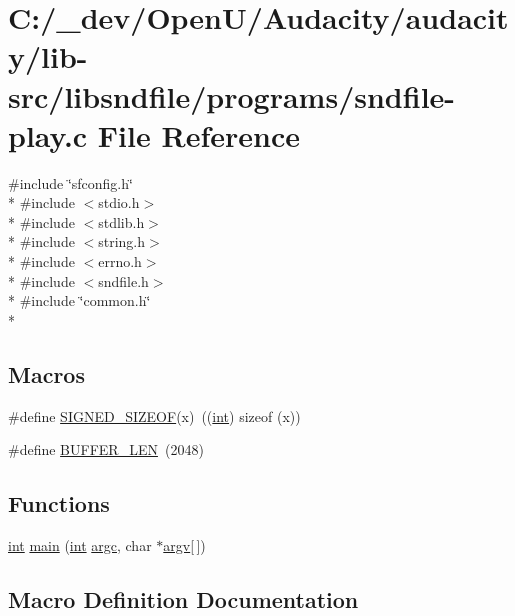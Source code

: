 \hypertarget{sndfile-play_8c}{}\section{C\+:/\+\_\+dev/\+Open\+U/\+Audacity/audacity/lib-\/src/libsndfile/programs/sndfile-\/play.c File Reference}
\label{sndfile-play_8c}
{\ttfamily \#include \char`\"{}sfconfig.\+h\char`\"{}}\\*
{\ttfamily \#include $<$stdio.\+h$>$}\\*
{\ttfamily \#include $<$stdlib.\+h$>$}\\*
{\ttfamily \#include $<$string.\+h$>$}\\*
{\ttfamily \#include $<$errno.\+h$>$}\\*
{\ttfamily \#include $<$sndfile.\+h$>$}\\*
{\ttfamily \#include \char`\"{}common.\+h\char`\"{}}\\*
\subsection*{Macros}
\begin{DoxyCompactItemize}
\item 
\#define \hyperlink{sndfile-play_8c_acf83332d0a0cf97b34429c37ecdb1e5b}{S\+I\+G\+N\+E\+D\+\_\+\+S\+I\+Z\+E\+OF}(x)~((\hyperlink{xmltok_8h_a5a0d4a5641ce434f1d23533f2b2e6653}{int}) sizeof (x))
\item 
\#define \hyperlink{sndfile-play_8c_a46130dc86f2322714bba26960b64e7bb}{B\+U\+F\+F\+E\+R\+\_\+\+L\+EN}~(2048)
\end{DoxyCompactItemize}
\subsection*{Functions}
\begin{DoxyCompactItemize}
\item 
\hyperlink{xmltok_8h_a5a0d4a5641ce434f1d23533f2b2e6653}{int} \hyperlink{sndfile-play_8c_a0ddf1224851353fc92bfbff6f499fa97}{main} (\hyperlink{xmltok_8h_a5a0d4a5641ce434f1d23533f2b2e6653}{int} \hyperlink{cmdline_8c_aaffeb1bf2056ea44af5b5d0ee4d6ff07}{argc}, char $\ast$\hyperlink{cmdline_8c_ad407d5ba91709bd9b092003858600723}{argv}\mbox{[}$\,$\mbox{]})
\end{DoxyCompactItemize}


\subsection{Macro Definition Documentation}
